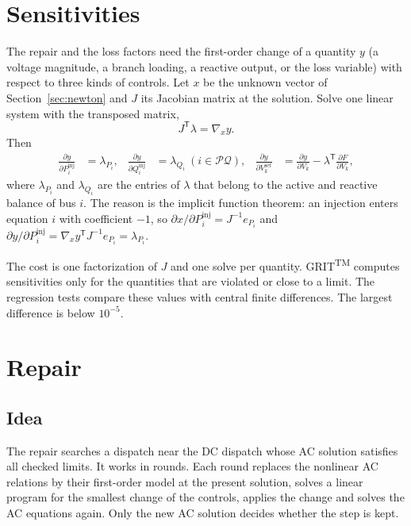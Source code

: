 \documentclass[a4paper,11pt]{article}
\newcommand{\TM}{\textsuperscript{TM}}
\newcommand{\GRIT}{GRIT\TM}
\begin{document}
\section{Sensitivities}\label{sec:sens}

The repair and the loss factors need the first-order change of a quantity $y$ (a voltage magnitude, a branch loading, a reactive output, or the loss variable) with respect to three kinds of controls. Let $x$ be the unknown vector of Section~\ref{sec:newton} and $J$ its Jacobian matrix at the solution. Solve one linear system with the transposed matrix,
\[
J^{\mathsf T}\lambda = \nabla_x y .
\]
Then
\begin{align*}
\frac{\partial y}{\partial P^{\mathrm{inj}}_i} &= \lambda_{P_i}, &
\frac{\partial y}{\partial Q^{\mathrm{inj}}_i} &= \lambda_{Q_i}\ (i\in\mathcal{PQ}), &
\frac{\partial y}{\partial V^{\mathrm{set}}_k} &= \frac{\partial y}{\partial V_k} - \lambda^{\mathsf T}\frac{\partial F}{\partial V_k},
\end{align*}
where $\lambda_{P_i}$ and $\lambda_{Q_i}$ are the entries of $\lambda$ that belong to the active and reactive balance of bus $i$. The reason is the implicit function theorem: an injection enters equation $i$ with coefficient $-1$, so $\partial x/\partial P^{\mathrm{inj}}_i = J^{-1}e_{P_i}$ and $\partial y/\partial P^{\mathrm{inj}}_i=\nabla_x y^{\mathsf T}J^{-1}e_{P_i}=\lambda_{P_i}$.

The cost is one factorization of $J$ and one solve per quantity. \GRIT{} computes sensitivities only for the quantities that are violated or close to a limit. The regression tests compare these values with central finite differences. The largest difference is below $10^{-5}$.

\section{Repair}\label{sec:repair}

\subsection{Idea}

The repair searches a dispatch near the DC dispatch whose AC solution satisfies all checked limits. It works in rounds. Each round replaces the nonlinear AC relations by their first-order model at the present solution, solves a linear program for the smallest change of the controls, applies the change and solves the AC equations again. Only the new AC solution decides whether the step is kept.
\end{document}
